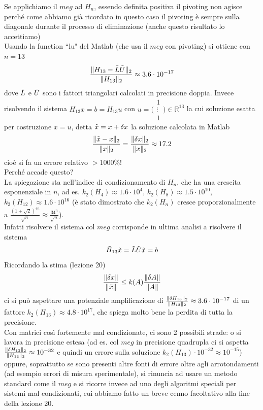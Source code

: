 \documentclass[12pt,a4paper]{article}
\DeclarePairedDelimiter{\norma}{\lVert}{\rVert}
\begin{document}
Se applichiamo il $meg$ ad $H_n$, essendo definita positiva il pivoting non agisce perché come abbiamo già ricordato in questo caso il pivoting è sempre sulla diagonale durante il processo di eliminazione (anche questo risultato lo accettiamo) \\
Usando la function ``lu" del Matlab (che usa il $meg$ con pivoting) si ottiene con $n=13$
\begin{equation*}
    \frac{\norma{H_{13}-\Tilde{L}\Tilde{U}}_2}{\norma{H_{13}}_2} \approx 3.6\cdot 10^{-17}
\end{equation*}
dove $\Tilde{L}$ e $\Tilde{U}$ sono i fattori triangolari calcolati in precisione doppia. Invece risolvendo il sistema $H_{13}x=b=H_{13}u$ con $u=\biggl(\begin{smallmatrix} 1 \\ \vdots \\ 1 \end{smallmatrix}\biggr) \in \mathbb{R}^{13}$ la cui soluzione esatta per costruzione $x=u$, detta $\Tilde{x}=x+\delta x$ la soluzione calcolata in Matlab
\begin{equation*}
    \frac{\norma{\Tilde{x}-x}_2}{\norma{x}_2}=\frac{\norma{\delta x}_2}{\norma{x}_2} \approx 17.2
\end{equation*}
cioè si fa un errore relativo $>1000\%$! \\
Perché accade questo?\\
La spiegazione sta nell'indice di condizionamento di $H_n$, che ha una crescita esponenziale in $n$, ad es. $k_2(H_4)\approx 1.6 \cdot 10^4$, $k_2(H_8) \approx 1.5\cdot 10^{10}$, $k_2(H_{12}) \approx 1.6 \cdot 10^{16}$ (è stato dimostrato che $k_2(H_n)$ cresce proporzionalmente a $\frac{(1+\sqrt{2})^{4n}}{\sqrt{n}} \approx \frac{34^n}{\sqrt{n}}$). \\
Infatti risolvere il sistema col $meg$ corrisponde in ultima analisi a risolvere il sistema
\begin{equation*}
    \Tilde{H}_{13}\Tilde{x} = \Tilde{L}\Tilde{U}\Tilde{x}=b
\end{equation*}
Ricordando la stima (lezione 20)
\begin{equation*}
    \frac{\norma{\delta x}}{\norma{\Tilde{x}}} \leq k(A) \frac{\norma{\delta A}}{\norma{A}}
\end{equation*}
ci si può aspettare una potenziale amplificazione di $\frac{\norma{\delta H_{13}}_2}{\norma{H_{13}}_2} \approx 3.6 \cdot 10^{-17}$ di un fattore $k_2(H_{13}) \approx 4.8 \cdot 10^{17}$, che spiega molto bene la perdita di tutta la precisione. \\Con matrici così fortemente mal condizionate, ci sono 2 possibili strade: o si lavora in precisione estesa (ad es. col $meg$ in precisione quadrupla ci si aspetta $\frac{\norma{\delta H_{13}}_2}{\norma{H_{13}}_2} \approx  10^{-32}$ e quindi un errore sulla soluzione $k_2(H_{13}) \cdot 10^{-32} \approx 10^{-15}$) oppure, soprattutto se sono presenti altre fonti di errore oltre agli arrotondamenti (ad esempio errori di misura sperimentale), si rinuncia ad usare un metodo standard come il $meg$ e si ricorre invece ad uno degli algoritmi speciali per sistemi mal condizionati, cui abbiamo fatto un breve cenno facoltativo alla fine della lezione 20.
\end{document}

